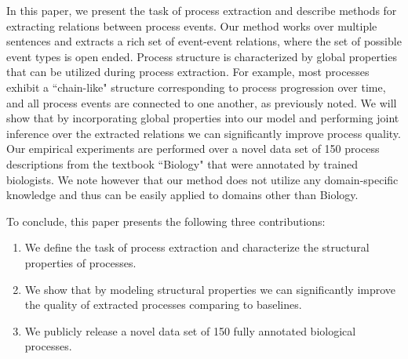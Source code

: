 In this paper, we present the task of process extraction and describe methods for extracting relations between process events. Our method works over multiple sentences and extracts a rich set of event-event relations, where the set of possible event types is open ended. Process structure is characterized by global properties that can be utilized during process extraction. For example, most processes exhibit a ``chain-like" structure corresponding to process progression over time, and all process events are connected to one another, as previously noted. We will show that by incorporating global properties into our model and performing joint inference over the extracted relations we can significantly improve process quality.  Our empirical experiments are performed over a novel data set of 150 process descriptions from the textbook ``Biology" \cite{CambellReece} that were annotated by trained biologists. We note however that our method does not utilize any domain-specific knowledge and thus can be easily applied to domains other than Biology.

To conclude, this paper presents the following three contributions:
\begin{enumerate}[itemsep=0pt,topsep=0pt] 
\item We define the task of process extraction and characterize the structural properties of processes.
\item We show that by modeling structural properties we can significantly improve the quality of extracted processes comparing to baselines.
\item  We publicly release a novel data set of 150 fully annotated biological processes.
\end{enumerate}
